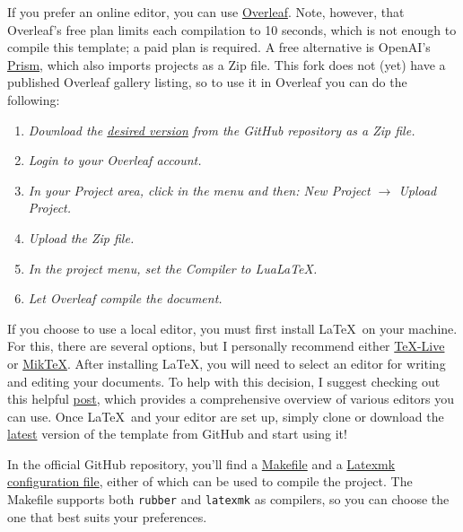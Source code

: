 If you prefer an online editor, you can use \href{https://www.overleaf.com/}{Overleaf}. Note, however, that Overleaf's free plan limits each compilation to 10 seconds, which is not enough to compile this template; a paid plan is required. A free alternative is OpenAI's \href{https://prism.openai.com/}{Prism}, which also imports projects as a Zip file. This fork does not (yet) have a published Overleaf gallery listing, so to use it in Overleaf you can do the following:

\begin{enumerate}[font=\itshape]
    \setlength{\itemsep}{.375em}
    \item \textit{Download the \href{https://github.com/mfrade/ULO-thesis/releases}{desired version} from the GitHub repository as a Zip file.}
    \item \textit{Login to your Overleaf account.}
    \item \textit{In your Project area, click in the menu and then: New Project \(\to\) Upload Project.}
    \item \textit{Upload the Zip file.}
    \item \textit{In the project menu, set the Compiler to LuaLaTeX.}
    \item \textit{Let Overleaf compile the document.}
\end{enumerate}

If you choose to use a local editor, you must first install \LaTeX~on your machine. For this, there are several options, but I personally recommend either \href{https://www.tug.org/texlive/}{TeX-Live} or \href{https://miktex.org/}{MikTeX}. After installing \LaTeX, you will need to select an editor for writing and editing your documents. To help with this decision, I suggest checking out this helpful \href{https://tex.stackexchange.com/questions/339/latex-editors-ides}{post}, which provides a comprehensive overview of various editors you can use. Once \LaTeX~and your editor are set up, simply clone or download the \href{https://github.com/mfrade/ULO-thesis/releases}{latest} version of the template from GitHub and start using it!

\begin{block}[tip]
In the official GitHub repository, you'll find a \href{https://github.com/mfrade/ULO-thesis/blob/master/Makefile}{Makefile} and a \href{https://github.com/mfrade/ULO-thesis/blob/master/.latexmkrc}{Latexmk configuration file}, either of which can be used to compile the project. The Makefile supports both \texttt{rubber} and \texttt{latexmk} as compilers, so you can choose the one that best suits your preferences.
\end{block}

